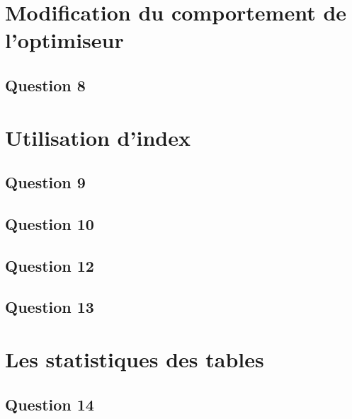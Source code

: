 \documentclass[a4paper,12pt]{article}
\begin{document}
\section{Modification du comportement de l'optimiseur}
\subsection{Question 8}

\section{Utilisation d'index}
\subsection{Question 9}

\subsection{Question 10}

\subsection{Question 12}

\subsection{Question 13}

\section{Les statistiques des tables}
\subsection{Question 14}
\end{document}
